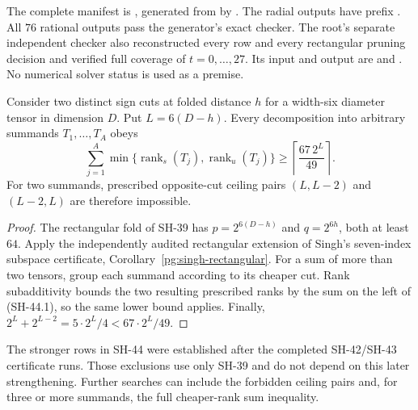 The complete manifest is
,
generated from
by .
The radial outputs have prefix
.
All $76$ rational outputs pass the generator's
exact checker.  The root's separate independent
checker also reconstructed every row and every
rectangular pruning decision and verified full
coverage of $t=0,\ldots,27$.  Its input and output
are 
and .
No numerical solver status is used as a premise.

\begin{corollary}
\label{cor:singh-sign-cut-constraints}
Consider two distinct sign cuts at folded distance $h$
for a width-six diameter tensor in dimension $D$.
Put $L=6(D-h)$.  Every decomposition into arbitrary
summands $T_1,\ldots,T_A$ obeys
\[
 \sum_{j=1}^A\min\{
   \operatorname{rank}_{s}(T_j),
   \operatorname{rank}_{u}(T_j)\}
 \ge\left\lceil\frac{67\,2^L}{49}\right\rceil.
                                                        \tag{SH-44.1}
\]
For two summands, prescribed opposite-cut ceiling
pairs $(L,L-2)$ and $(L-2,L)$ are therefore impossible.
\end{corollary}

\begin{proof}
The rectangular fold of SH-39 has
$p=2^{6(D-h)}$ and $q=2^{6h}$, both at least $64$.
Apply the independently audited rectangular extension
of Singh's seven-index subspace certificate,
Corollary~\ref{pg:singh-rectangular}.
For a sum of more than two tensors, group each
summand according to its cheaper cut.  Rank
subadditivity bounds the two resulting prescribed
ranks by the sum on the left of (SH-44.1), so the
same lower bound applies.  Finally,
$2^L+2^{L-2}=5\cdot2^L/4<67\cdot2^L/49$.
\end{proof}

The stronger rows in SH-44 were established after
the completed SH-42/SH-43 certificate runs.  Those
exclusions use only SH-39 and do not depend on this
later strengthening.  Further searches can include
the forbidden ceiling pairs and, for three or more
summands, the full cheaper-rank sum inequality.

